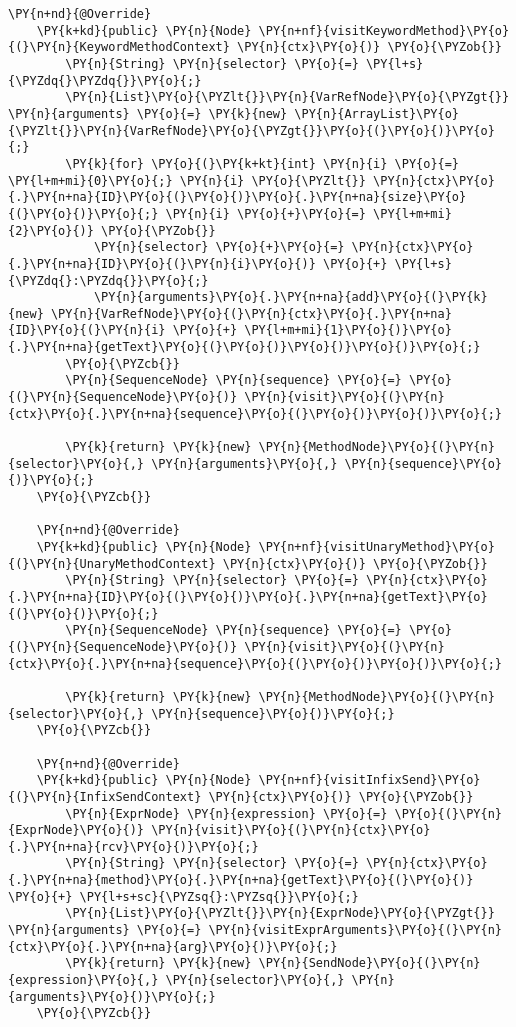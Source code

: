 \begin{Verbatim}[commandchars=\\\{\}]
    \PY{n+nd}{@Override}
    \PY{k+kd}{public} \PY{n}{Node} \PY{n+nf}{visitKeywordMethod}\PY{o}{(}\PY{n}{KeywordMethodContext} \PY{n}{ctx}\PY{o}{)} \PY{o}{\PYZob{}}
        \PY{n}{String} \PY{n}{selector} \PY{o}{=} \PY{l+s}{\PYZdq{}\PYZdq{}}\PY{o}{;}
        \PY{n}{List}\PY{o}{\PYZlt{}}\PY{n}{VarRefNode}\PY{o}{\PYZgt{}} \PY{n}{arguments} \PY{o}{=} \PY{k}{new} \PY{n}{ArrayList}\PY{o}{\PYZlt{}}\PY{n}{VarRefNode}\PY{o}{\PYZgt{}}\PY{o}{(}\PY{o}{)}\PY{o}{;}
        \PY{k}{for} \PY{o}{(}\PY{k+kt}{int} \PY{n}{i} \PY{o}{=} \PY{l+m+mi}{0}\PY{o}{;} \PY{n}{i} \PY{o}{\PYZlt{}} \PY{n}{ctx}\PY{o}{.}\PY{n+na}{ID}\PY{o}{(}\PY{o}{)}\PY{o}{.}\PY{n+na}{size}\PY{o}{(}\PY{o}{)}\PY{o}{;} \PY{n}{i} \PY{o}{+}\PY{o}{=} \PY{l+m+mi}{2}\PY{o}{)} \PY{o}{\PYZob{}}
            \PY{n}{selector} \PY{o}{+}\PY{o}{=} \PY{n}{ctx}\PY{o}{.}\PY{n+na}{ID}\PY{o}{(}\PY{n}{i}\PY{o}{)} \PY{o}{+} \PY{l+s}{\PYZdq{}:\PYZdq{}}\PY{o}{;}
            \PY{n}{arguments}\PY{o}{.}\PY{n+na}{add}\PY{o}{(}\PY{k}{new} \PY{n}{VarRefNode}\PY{o}{(}\PY{n}{ctx}\PY{o}{.}\PY{n+na}{ID}\PY{o}{(}\PY{n}{i} \PY{o}{+} \PY{l+m+mi}{1}\PY{o}{)}\PY{o}{.}\PY{n+na}{getText}\PY{o}{(}\PY{o}{)}\PY{o}{)}\PY{o}{)}\PY{o}{;}
        \PY{o}{\PYZcb{}}
        \PY{n}{SequenceNode} \PY{n}{sequence} \PY{o}{=} \PY{o}{(}\PY{n}{SequenceNode}\PY{o}{)} \PY{n}{visit}\PY{o}{(}\PY{n}{ctx}\PY{o}{.}\PY{n+na}{sequence}\PY{o}{(}\PY{o}{)}\PY{o}{)}\PY{o}{;}

        \PY{k}{return} \PY{k}{new} \PY{n}{MethodNode}\PY{o}{(}\PY{n}{selector}\PY{o}{,} \PY{n}{arguments}\PY{o}{,} \PY{n}{sequence}\PY{o}{)}\PY{o}{;}
    \PY{o}{\PYZcb{}}
    
    \PY{n+nd}{@Override}
    \PY{k+kd}{public} \PY{n}{Node} \PY{n+nf}{visitUnaryMethod}\PY{o}{(}\PY{n}{UnaryMethodContext} \PY{n}{ctx}\PY{o}{)} \PY{o}{\PYZob{}}
        \PY{n}{String} \PY{n}{selector} \PY{o}{=} \PY{n}{ctx}\PY{o}{.}\PY{n+na}{ID}\PY{o}{(}\PY{o}{)}\PY{o}{.}\PY{n+na}{getText}\PY{o}{(}\PY{o}{)}\PY{o}{;}
        \PY{n}{SequenceNode} \PY{n}{sequence} \PY{o}{=} \PY{o}{(}\PY{n}{SequenceNode}\PY{o}{)} \PY{n}{visit}\PY{o}{(}\PY{n}{ctx}\PY{o}{.}\PY{n+na}{sequence}\PY{o}{(}\PY{o}{)}\PY{o}{)}\PY{o}{;}

        \PY{k}{return} \PY{k}{new} \PY{n}{MethodNode}\PY{o}{(}\PY{n}{selector}\PY{o}{,} \PY{n}{sequence}\PY{o}{)}\PY{o}{;}
    \PY{o}{\PYZcb{}}

    \PY{n+nd}{@Override}
    \PY{k+kd}{public} \PY{n}{Node} \PY{n+nf}{visitInfixSend}\PY{o}{(}\PY{n}{InfixSendContext} \PY{n}{ctx}\PY{o}{)} \PY{o}{\PYZob{}}
        \PY{n}{ExprNode} \PY{n}{expression} \PY{o}{=} \PY{o}{(}\PY{n}{ExprNode}\PY{o}{)} \PY{n}{visit}\PY{o}{(}\PY{n}{ctx}\PY{o}{.}\PY{n+na}{rcv}\PY{o}{)}\PY{o}{;}
        \PY{n}{String} \PY{n}{selector} \PY{o}{=} \PY{n}{ctx}\PY{o}{.}\PY{n+na}{method}\PY{o}{.}\PY{n+na}{getText}\PY{o}{(}\PY{o}{)} \PY{o}{+} \PY{l+s+sc}{\PYZsq{}:\PYZsq{}}\PY{o}{;}
        \PY{n}{List}\PY{o}{\PYZlt{}}\PY{n}{ExprNode}\PY{o}{\PYZgt{}} \PY{n}{arguments} \PY{o}{=} \PY{n}{visitExprArguments}\PY{o}{(}\PY{n}{ctx}\PY{o}{.}\PY{n+na}{arg}\PY{o}{)}\PY{o}{;}
        \PY{k}{return} \PY{k}{new} \PY{n}{SendNode}\PY{o}{(}\PY{n}{expression}\PY{o}{,} \PY{n}{selector}\PY{o}{,} \PY{n}{arguments}\PY{o}{)}\PY{o}{;}
    \PY{o}{\PYZcb{}}


\end{Verbatim}
